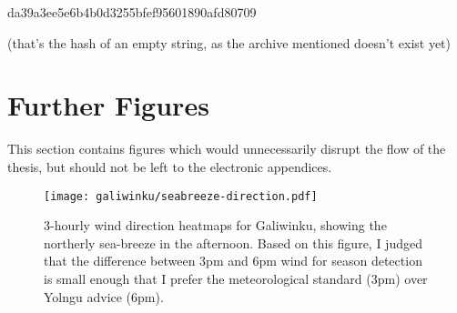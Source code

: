 da39a3ee5e6b4b0d3255bfef95601890afd80709

(that's the hash of an empty string, as the archive mentioned doesn't exist yet)



\section{Further Figures}
This section contains figures which would unnecessarily disrupt the
flow of the thesis, but should not be left to the electronic appendices.

\begin{figure}[p]
    \centering
    \texttt{[image: galiwinku/seabreeze-direction.pdf]}
    \caption[3-hourly wind direction heatmaps, Galiwinku]{
        3-hourly wind direction heatmaps for Galiwinku,
        showing the northerly sea-breeze in the afternoon.
        Based on this figure, I judged that the difference between
        3pm and 6pm wind for season detection is small enough that
        I prefer the meteorological standard (3pm) over Yolngu advice (6pm).}
    \label{fig:galiwinku-seabreeze-direction}
\end{figure}
